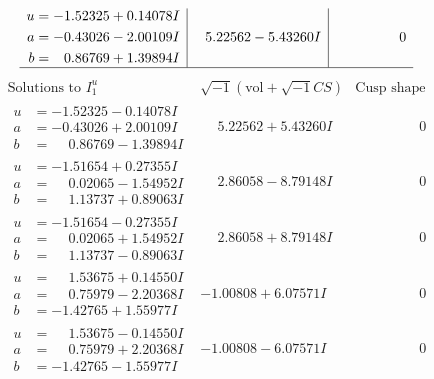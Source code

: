 \documentclass[1p]{elsarticle_modified}
\theoremstyle{definition}
\newcommand{\I}{\sqrt{-1}}
\begin{document}
$$\begin{array}{c|c|c}
\begin{aligned}
u &= -1.52325 + 0.14078 I \\
a &= -0.43026 - 2.00109 I \\
b &= \phantom{-}0.86769 + 1.39894 I\end{aligned}
 & \phantom{-}5.22562 - 5.43260 I & \phantom{-0.000000 } 0\\
 \hline 
 \end{array}$$\newpage$$\begin{array}{c|c|c}  
\text{Solutions to }I^u_{1}& \I (\text{vol} + \sqrt{-1}CS) & \text{Cusp shape}\\
 \hline 
\begin{aligned}
u &= -1.52325 - 0.14078 I \\
a &= -0.43026 + 2.00109 I \\
b &= \phantom{-}0.86769 - 1.39894 I\end{aligned}
 & \phantom{-}5.22562 + 5.43260 I & \phantom{-0.000000 } 0 \\ \hline\begin{aligned}
u &= -1.51654 + 0.27355 I \\
a &= \phantom{-}0.02065 - 1.54952 I \\
b &= \phantom{-}1.13737 + 0.89063 I\end{aligned}
 & \phantom{-}2.86058 - 8.79148 I & \phantom{-0.000000 } 0 \\ \hline\begin{aligned}
u &= -1.51654 - 0.27355 I \\
a &= \phantom{-}0.02065 + 1.54952 I \\
b &= \phantom{-}1.13737 - 0.89063 I\end{aligned}
 & \phantom{-}2.86058 + 8.79148 I & \phantom{-0.000000 } 0 \\ \hline\begin{aligned}
u &= \phantom{-}1.53675 + 0.14550 I \\
a &= \phantom{-}0.75979 - 2.20368 I \\
b &= -1.42765 + 1.55977 I\end{aligned}
 & -1.00808 + 6.07571 I & \phantom{-0.000000 } 0 \\ \hline\begin{aligned}
u &= \phantom{-}1.53675 - 0.14550 I \\
a &= \phantom{-}0.75979 + 2.20368 I \\
b &= -1.42765 - 1.55977 I\end{aligned}
 & -1.00808 - 6.07571 I & \phantom{-0.000000 } 0 \\ \hline\begin{aligned}

\end{aligned}
\end{array}$$
\end{document}
